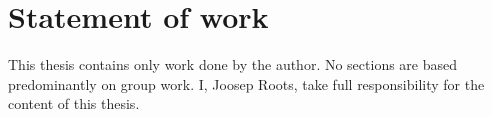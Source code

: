 \chapter*{Statement of work}

This thesis contains only work done by the author. 
No sections are based predominantly on group work.
I, Joosep Roots, take full responsibility for the content of this thesis.